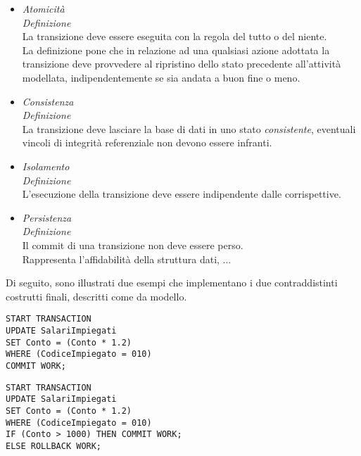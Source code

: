 \documentclass{article}
\begin{document}
\begin{itemize}[label={-}]
    \itemsep0em
    \item \textit{Atomicità}\vspace*{7pt}\\ \textit{Definizione}\\La transizione deve essere eseguita con la regola del tutto o del niente.\vspace*{7pt}\\ La definizione pone che in relazione ad una qualsiasi azione adottata la transizione deve provvedere al ripristino dello stato precedente all'attività modellata, indipendentemente se sia andata a buon fine o meno.
    \item \textit{Consistenza}\vspace*{7pt}\\ \textit{Definizione}\\La transizione deve lasciare la base di dati in uno stato \textit{consistente}, eventuali vincoli di integrità referenziale non devono essere infranti.
    \item \textit{Isolamento}\vspace*{7pt}\\ \textit{Definizione}\\L'esecuzione della transizione deve essere indipendente dalle corrispettive.
    \item \textit{Persistenza}\vspace*{7pt}\\ \textit{Definizione}\\Il commit di una transizione non deve essere perso.\vspace*{14pt}\\Rappresenta l'affidabilità della struttura dati, ... 
\end{itemize}
Di seguito, sono illustrati due esempi che implementano i due contraddistinti costrutti finali, descritti come da modello.\vspace*{14pt}\\
\begin{minipage}{\textwidth}
    \begin{lstlisting}
START TRANSACTION
UPDATE SalariImpiegati
SET Conto = (Conto * 1.2)
WHERE (CodiceImpiegato = 010)
COMMIT WORK;
    \end{lstlisting}
\end{minipage}\vspace*{14pt}
\begin{minipage}{\textwidth}
    \begin{lstlisting}
START TRANSACTION
UPDATE SalariImpiegati
SET Conto = (Conto * 1.2)
WHERE (CodiceImpiegato = 010)
IF (Conto > 1000) THEN COMMIT WORK;
ELSE ROLLBACK WORK;
    \end{lstlisting}
\end{minipage}\vspace*{14pt}
\end{document}
